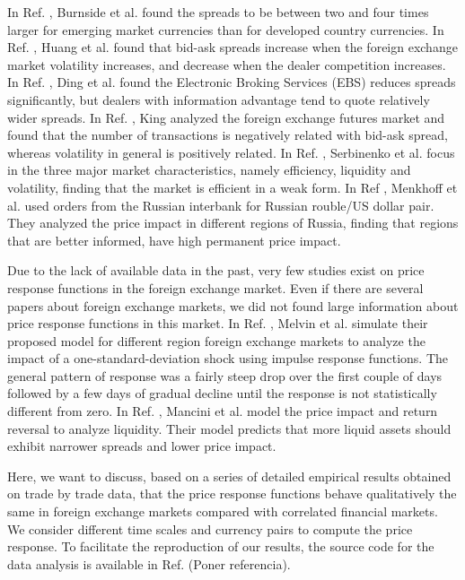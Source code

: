 In Ref. \cite{curr_speculation}, Burnside et al. found the spreads to be
between two and four times larger for emerging market currencies than for
developed country currencies. In Ref. \cite{spread_competition}, Huang et al.
found that bid-ask spreads increase when the foreign exchange market volatility
increases, and decrease when the dealer competition increases. In Ref.
\cite{electronic_forex}, Ding et al. found the Electronic Broking Services
(EBS) reduces spreads significantly, but dealers with information advantage
tend to quote relatively wider spreads. In Ref. \cite{spread_futures}, King
analyzed the foreign exchange futures market and found that the number of
transactions is negatively related with bid-ask spread, whereas volatility in
general is positively related. In Ref. \cite{intraday_forex}, Serbinenko et al.
focus in the three major market characteristics, namely efficiency, liquidity
and volatility, finding that the market is efficient in a weak form. In Ref
\cite{local_forex}, Menkhoff et al. used orders from the Russian interbank for
Russian rouble/US dollar pair. They analyzed the price impact in different
regions of Russia, finding that regions that are better informed, have high
permanent price impact.

Due to the lack of available data in the past, very few studies exist on price
response functions in the foreign exchange market. Even if there are several
papers about foreign exchange markets, we did not found large information about
price response functions in this market. In Ref. \cite{forex_volatility},
Melvin et al. simulate their proposed model for different region foreign
exchange markets to analyze the impact of a one-standard-deviation shock using
impulse response functions. The general pattern of response was a fairly steep
drop over the first couple of days followed by a few days of gradual decline
until the response is not statistically different from zero. In Ref.
\cite{forex_liquidity}, Mancini et al. model the price impact and return
reversal to analyze liquidity. Their model predicts that more liquid assets
should exhibit narrower spreads and lower price impact.

Here, we want to discuss, based on a series of detailed empirical results
obtained on trade by trade data, that the price response functions behave
qualitatively the same in foreign exchange markets compared with correlated
financial markets. We consider different time scales and currency pairs to
compute the price response. To facilitate the reproduction of our results, the
source code for the data analysis is available in Ref. (Poner referencia).

